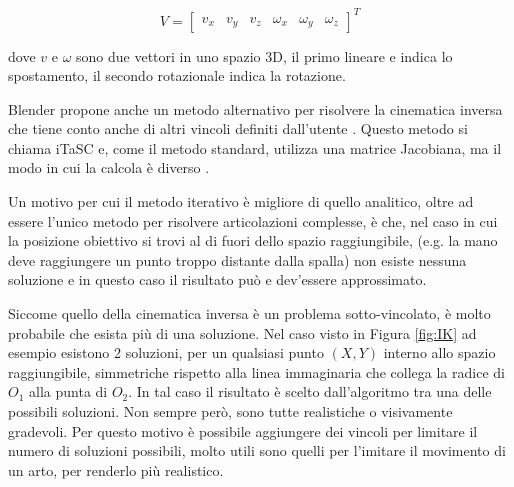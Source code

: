 \[V=
\begin{bmatrix}
v_x & v_y & v_z & \omega_x & \omega_y & \omega_z
\end{bmatrix}
^T\]    

dove $v$ e $\omega$ sono due vettori in uno spazio 3D, il primo lineare e indica lo spostamento, il secondo rotazionale indica la rotazione.

Blender propone anche un metodo alternativo per risolvere la cinematica inversa che tiene conto anche di altri vincoli definiti dall'utente \cite{blendDoc}. Questo metodo si chiama iTaSC e, come il metodo standard, utilizza una matrice Jacobiana, ma il modo in cui la calcola è diverso \cite{blendWiki}.

Un motivo per cui il metodo iterativo è migliore di quello analitico, oltre ad essere l'unico metodo per risolvere articolazioni complesse, è che, nel caso in cui la posizione obiettivo si trovi al di fuori dello spazio raggiungibile, (e.g. la mano deve raggiungere un punto troppo distante dalla spalla) non esiste nessuna soluzione e in questo caso il risultato può e dev'essere approssimato.

Siccome quello della cinematica inversa è un problema sotto-vincolato, è molto probabile che esista più di una soluzione. Nel caso visto in Figura \ref{fig:IK} ad esempio esistono 2 soluzioni, per un qualsiasi punto $(X,Y)$ interno allo spazio raggiungibile, simmetriche rispetto alla linea immaginaria che collega la radice di $O_1$ alla punta di $O_2$.
In tal caso il risultato è scelto dall'algoritmo tra una delle possibili soluzioni. Non sempre però, sono tutte realistiche o visivamente gradevoli.
Per questo motivo è possibile aggiungere dei vincoli per limitare il numero di soluzioni possibili, molto utili sono quelli per l'imitare il movimento di un arto, per renderlo più realistico.


